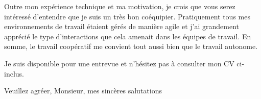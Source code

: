  
Outre mon expérience technique et ma motivation, je crois que vous serez intéressé d'entendre que je suis un très bon coéquipier. Pratiquement tous mes environnements de travail étaient gérés de manière agile et j'ai grandement apprécié le type d'interactions que cela amenait dans les équipes de travail. En somme, le travail coopératif me convient tout aussi bien que le travail autonome.

Je suis disponible pour une entrevue et n’hésitez pas à consulter mon CV ci-inclus.

Veuillez agréer, Monsieur, mes sincères salutations

